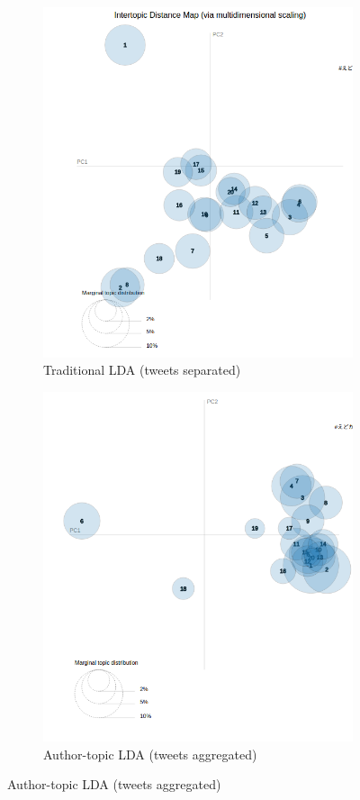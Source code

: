 \documentclass[11pt]{article}
\begin{document}
\begin{figure}[H]
    \centering
    \begin{subfigure}{.49\linewidth}
    \includegraphics[width=\linewidth]{lda_vis_sep}
    \caption{Traditional LDA (tweets separated)}\label{fig:res_lda_vis_sep}
    \end{subfigure}
    \begin{subfigure}{.49\linewidth}
    \includegraphics[width=\linewidth]{lda_vis_grp}
    \caption{Author-topic LDA (tweets aggregated)}\label{fig:res_lda_vis_grp}
    \end{subfigure}
    

\end{figure}
\end{document}
